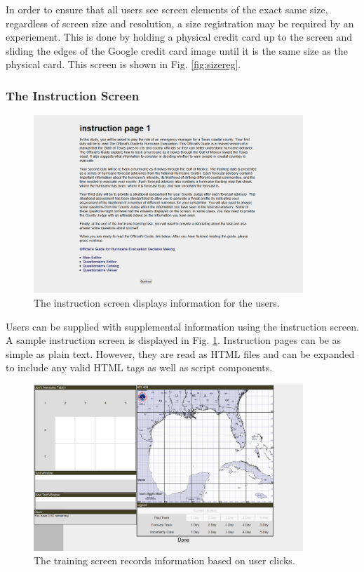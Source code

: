 \documentclass[article]{ij4uq}              %
\begin{document}
In order to ensure that all users see screen elements of the exact same size, regardless of screen size and resolution, a size registration may be required by an experiement. This is done by holding a physical credit card up to the screen and sliding the edges of the Google credit card image until it is the same size as the physical card. This screen is shown in Fig. \ref{fig:sizereg}.

\subsubsection{The Instruction Screen}

\begin{figure}[h!]
 \centering
 \includegraphics[width=4.0in]{figures/instruction_page.png}
 \caption{The instruction screen displays information for the users.}
 \label{fig:inst}
\end{figure}
\FloatBarrier

Users can be supplied with supplemental information using the instruction screen. A sample instruction screen is displayed in Fig. \ref{fig:inst}.  Instruction pages can be as simple as plain text.  However, they are read as HTML files and can be expanded to include any valid HTML tags as well as script components.

\begin{figure}[h!]
 \centering
 \includegraphics[width=4.0in]{figures/training_page.png}
 \caption{The training screen records information based on user clicks.}
 \label{fig:train}
\end{figure}
\FloatBarrier
\end{document}
